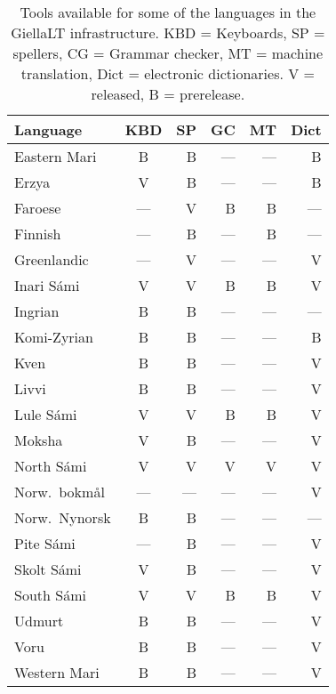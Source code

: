 \documentclass[free]{flammie}
\begin{document}
\begin{table}[htb]
\begin{small}
    \centering
    \begin{tabular}{lcrrrr}
    Language & KBD &  SP &  GC &  MT & Dict\\
       \toprule
Eastern Mari &   B &   B & --- & --- &   B \\
Erzya        &   V &   B & --- & --- &   B \\
Faroese      & --- &   V &   B &   B & --- \\
Finnish      & --- &   B & --- &   B & --- \\
Greenlandic  & --- &   V & --- & --- &   V \\
Inari Sámi   &   V &   V &   B &   B &   V \\
Ingrian      &   B &   B & --- & --- & --- \\
Komi-Zyrian  &   B &   B & --- & --- &   B \\
Kven         &   B &   B & --- & --- &   V \\
Livvi        &   B &   B & --- & --- &   V \\
Lule Sámi    &   V &   V &   B &   B &   V \\
Moksha       &   V &   B & --- & --- &   V \\
North Sámi   &   V &   V &   V &   V &   V \\
Norw.\ bokmål & --- & --- & --- & --- &   V \\
Norw.\ Nynorsk&   B &   B & --- & --- & --- \\
Pite Sámi    & --- &   B & --- & --- &   V \\
Skolt Sámi   &   V &   B & --- & --- &   V \\
South Sámi   &   V &   V &   B &   B &   V \\
Udmurt       &   B &   B & --- & --- &   V \\
Voru         &   B &   B & --- & --- &   V \\
Western Mari &   B &   B & --- & --- &   V \\
    \end{tabular}
    \caption{Tools available for some of the languages in the GiellaLT
    infrastructure. KBD = Keyboards, SP = spellers, CG = Grammar checker,
    MT = machine translation, Dict = electronic dictionaries.
    V = released, B = prerelease.\label{tab:tools}}
\end{small}
\end{table}
\end{document}
